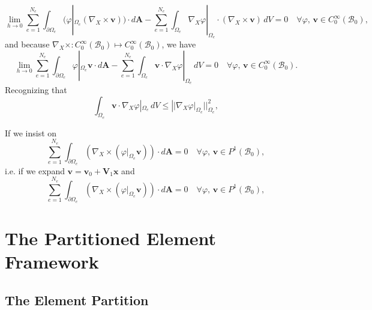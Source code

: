 \begin{equation}
	\lim_{h \rightarrow 0} \sum_{e = 1}^{N_e} \int_{\partial \Omega_e} (\varphi|_{\Omega_e} (\nabla_X \times \mathbf{v})) \cdot d\mathbf{A} - \sum_{e = 1}^{N_e} \int_{\Omega_e} \nabla_X \varphi|_{\Omega_e} \cdot (\nabla_X \times \mathbf{v}) \, dV = 0 \quad \forall \varphi, \, \mathbf{v} \in C^\infty_0 (\mathcal{B}_0),
\end{equation}
and because $\nabla_X \times : C^\infty_0 (\mathcal{B}_0) \mapsto C^\infty_0 (\mathcal{B}_0)$, we have
\begin{equation}
	\lim_{h \rightarrow 0} \sum_{e = 1}^{N_e} \int_{\partial \Omega_e} \varphi|_{\Omega_e} \mathbf{v} \cdot d\mathbf{A} - \sum_{e = 1}^{N_e} \int_{\Omega_e} \mathbf{v} \cdot \nabla_X \varphi|_{\Omega_e} \, dV = 0 \quad \forall \varphi, \, \mathbf{v} \in C^\infty_0 (\mathcal{B}_0).
\end{equation}
Recognizing that
\begin{equation}
	\int_{\Omega_e} \mathbf{v} \cdot \nabla_X \varphi|_{\Omega_e} \, dV \leq  || \nabla_X \varphi|_{\Omega_e} ||^2_{\Omega_e},
\end{equation}

If we insist on
\begin{equation}
	\sum_{e = 1}^{N_e} \int_{\partial \Omega_e} (\nabla_X \times (\varphi|_{\Omega_e} \mathbf{v})) \cdot d\mathbf{A} = 0 \quad \forall \varphi, \, \mathbf{v} \in P^1 (\mathcal{B}_0),
\end{equation}
i.e. if we expand $\mathbf{v} = \mathbf{v}_0 + \mathbf{V}_1 \mathbf{x}$ and 
\begin{equation}
	\sum_{e = 1}^{N_e} \int_{\partial \Omega_e} (\nabla_X \times (\varphi|_{\Omega_e} \mathbf{v})) \cdot d\mathbf{A} = 0 \quad \forall \varphi, \, \mathbf{v} \in P^1 (\mathcal{B}_0),
\end{equation}

\section{The Partitioned Element Framework}

\subsection*{The Element Partition}


